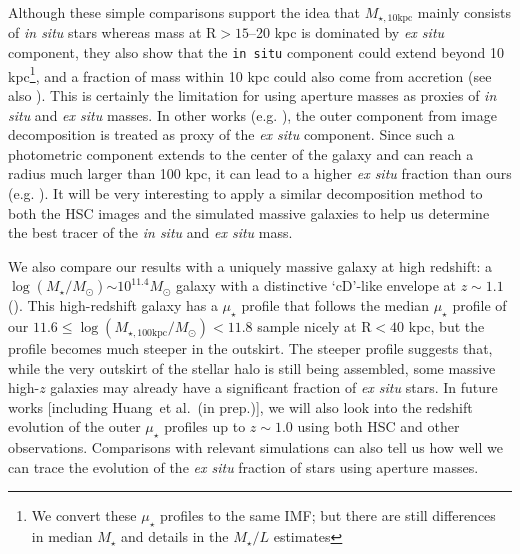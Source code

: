 \documentclass[fleqn,usenatbib]{mnras}
\def\etal{{\ et al.~}}
\def\mstar{{$M_{\star}$}}
\def\logms{{$\log (M_{\star}/M_{\odot})$}}
\def\minn{{$M_{\star,10\mathrm{kpc}}$}}
\def\logmtot{{$\log (M_{\star,100\mathrm{kpc}}/M_{\odot})$}}
\def\m2l{{$M_{\star}/L$}}
\def\mden{{$\mu_{\star}$}}
\begin{document}
    Although these simple comparisons support the idea that \minn{} mainly consists 
    of \textit{in situ} stars whereas mass at $\mathrm{R} > 15$--20 kpc is dominated 
    by \textit{ex situ} component, they also show that the \texttt{in situ} component 
    could extend beyond 10 kpc\footnote{We convert these \mden{} profiles to the same 
    \citealt{Chabrier2003} IMF; but there are still differences in median \mstar{} 
    and details in the \m2l{} estimates}, and a fraction of mass within 10 kpc could 
    also come from accretion (see also \citealt{RodriguezGomez2016}). 
    This is certainly the limitation for using aperture masses as proxies of 
    \textit{in situ} and \textit{ex situ} masses. 
    In other works (e.g. \citealt{Huang2013a, Spavone2017}), 
    the outer component from image decomposition is treated as proxy of the 
    \textit{ex situ} component. 
    Since such a photometric component extends to the center of the galaxy and can 
    reach a radius much larger than 100 kpc, it can lead to a higher \textit{ex situ}
    fraction than ours (e.g. \citealt{Spavone2017}). 
    It will be very interesting to apply a similar decomposition method to both the 
    HSC images and the simulated massive galaxies to help us determine the 
    best tracer of the \textit{in situ} and \textit{ex situ} mass.

    We also compare our results with a uniquely massive galaxy at high redshift: 
    a \logms{}${\sim} 10^{11.4} M_{\odot}$ galaxy with a distinctive `cD'-like 
    envelope at $z{\sim} 1.1$ (\citealt{Liu2013}).  
    This high-redshift galaxy has a \mden{} profile that follows the median \mden{} 
    profile of our $11.6\leq$\logmtot{}$<11.8$ sample nicely at $\mathrm{R} < 40$ 
    kpc, but the profile becomes much steeper in the outskirt.
    The steeper profile suggests that, while the very outskirt of the stellar halo 
    is still being assembled, some massive high-$z$ galaxies may already have a
    significant fraction of \textit{ex situ} stars. 
    In future works [including Huang\etal (in prep.)], we will also look into the 
    redshift evolution of the outer \mden{} profiles up to $z\sim 1.0$ using both HSC 
    and other observations. 
    Comparisons with relevant simulations  can also tell us how well we can trace
    the evolution of the \textit{ex situ} fraction of stars using aperture masses.


\end{document}
